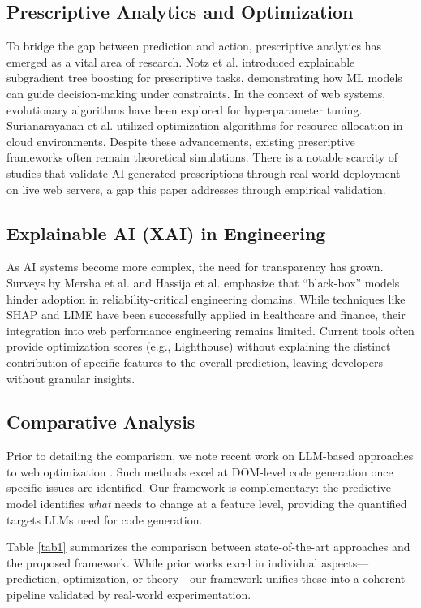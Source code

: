 \documentclass[conference]{IEEEtran}
\begin{document}
\subsection{Prescriptive Analytics and Optimization}
To bridge the gap between prediction and action, prescriptive analytics has emerged as a vital area of research. Notz et al. \cite{notz2024} introduced explainable subgradient tree boosting for prescriptive tasks, demonstrating how ML models can guide decision-making under constraints. In the context of web systems, evolutionary algorithms have been explored for hyperparameter tuning. Surianarayanan et al. \cite{surianarayanan2023} utilized optimization algorithms for resource allocation in cloud environments. Despite these advancements, existing prescriptive frameworks often remain theoretical simulations. There is a notable scarcity of studies that validate AI-generated prescriptions through real-world deployment on live web servers, a gap this paper addresses through empirical validation.

\subsection{Explainable AI (XAI) in Engineering}
As AI systems become more complex, the need for transparency has grown. Surveys by Mersha et al. \cite{mersha2024} and Hassija et al. \cite{hassija2024} emphasize that ``black-box'' models hinder adoption in reliability-critical engineering domains. While techniques like SHAP and LIME have been successfully applied in healthcare and finance, their integration into web performance engineering remains limited. Current tools often provide optimization scores (e.g., Lighthouse) without explaining the distinct contribution of specific features to the overall prediction, leaving developers without granular insights.

\subsection{Comparative Analysis}
Prior to detailing the comparison, we note recent work on LLM-based approaches to web optimization \cite{burg2026}. Such methods excel at DOM-level code generation once specific issues are identified. Our framework is complementary: the predictive model identifies \textit{what} needs to change at a feature level, providing the quantified targets LLMs need for code generation.

Table \ref{tab1} summarizes the comparison between state-of-the-art approaches and the proposed framework. While prior works excel in individual aspects---prediction, optimization, or theory---our framework unifies these into a coherent pipeline validated by real-world experimentation.
\end{document}
